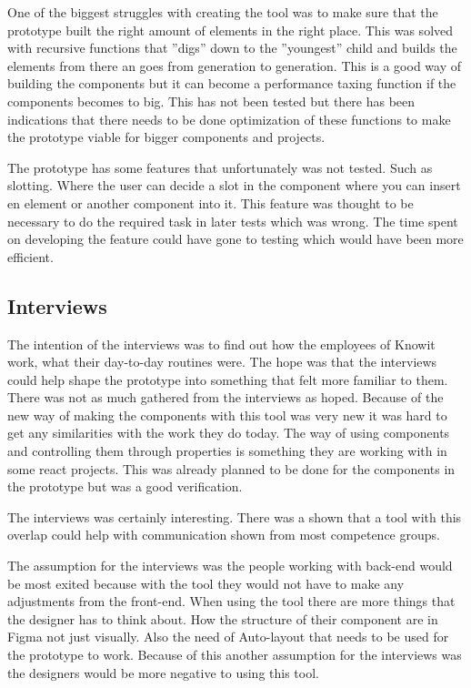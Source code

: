 One of the biggest struggles with creating the tool was to make sure that the prototype built the right amount of elements in the right place. This was solved with recursive functions that ''digs'' down to the ''youngest'' child and builds the elements from there an goes from generation to generation. This is a good way of building the components but it can become a performance taxing function if the components becomes to big. This has not been tested but there has been indications that there needs to be done optimization of these functions to make the prototype viable for bigger components and projects.

The prototype has some features that unfortunately was not tested. Such as slotting. Where the user can decide a slot in the component where you can insert en element or another component into it. This feature was thought to be necessary to do the required task in later tests which was wrong. The time spent on developing the feature could have gone to testing which would have been more efficient.



\subsection{Interviews}%
\label{sub:Interviews}

The intention of the interviews was to find out how the employees of Knowit work, what their day-to-day routines were. The hope was that the interviews could help shape the prototype into something that felt more familiar to them. There was not as much gathered from the interviews as hoped. Because of the new way of making the components with this tool was very new it was hard to get any similarities with the work they do today. The way of using components and controlling them through properties is something they are working with in some react projects. This was already planned to be done for the components in the prototype but was a good verification.

The interviews was certainly interesting. There was a shown that a tool with this overlap could help with communication shown from most competence groups.

The assumption for the interviews was the people working with back-end would be most exited because with the tool they would not have to make any adjustments from the front-end. When using the tool there are more things that the designer has to think about. How the structure of their component are in Figma not just visually. Also the need of Auto-layout that needs to be used for the prototype to work. Because of this another assumption for the interviews was the designers would be more negative to using this tool. 

